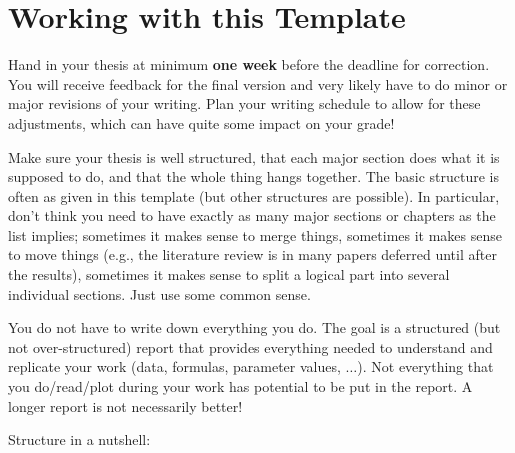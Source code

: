 
\chapter{Working with this Template}
\label{sec:Tutorial}

Hand in your thesis at minimum \textbf{one week} before the deadline for correction. You will receive feedback for the final version and very likely have to do minor or major revisions of your writing. Plan your writing schedule to allow for these adjustments, which can have quite some impact on your grade!



Make sure your thesis is well structured, that each major section does what it is supposed to do, and that the whole thing hangs together. The basic structure is often as given in this template (but other structures are possible). In particular, don't think you need to have exactly as many major sections or chapters as the list implies; sometimes it makes sense to merge things, sometimes it makes sense to move things (e.g., the literature review is in many papers deferred until after the results), sometimes it makes sense to split a logical part into several individual sections. Just use some common sense.

You do not have to write down everything you do. The goal is a structured (but not over-structured) report that provides everything needed to understand and replicate your work (data, formulas, parameter values, $\ldots$). Not everything that you do/read/plot during your work has potential to be put in the report. A longer report is not necessarily better!

\vspace{\baselineskip}

Structure in a nutshell:

